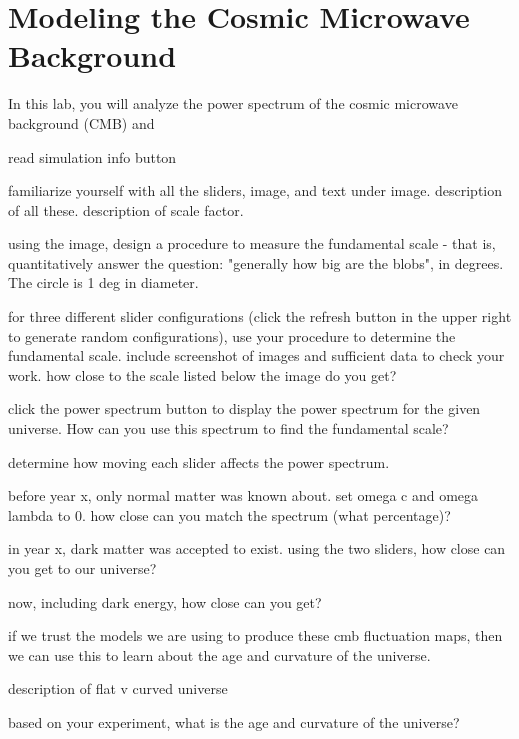 \chapter{Modeling the Cosmic Microwave Background}

In this lab, you will analyze the power spectrum of the cosmic microwave background (CMB) and %

read simulation info button

familiarize yourself with all the sliders, image, and text under image. description of all these. description of scale factor.

using the image, design a procedure to measure the fundamental scale - that is, quantitatively answer the question: "generally how big are the blobs", in degrees. The circle is 1 deg in diameter.

for three different slider configurations (click the refresh button in the upper right to generate random configurations), use your procedure to determine the fundamental scale. include screenshot of images and sufficient data to check your work. how close to the scale listed below the image do you get?

click the power spectrum button to display the power spectrum for the given universe. How can you use this spectrum to find the fundamental scale?

determine how moving each slider affects the power spectrum.

before year x, only normal matter was known about. set omega c and omega lambda to 0. how close can you match the spectrum (what percentage)?

in year x, dark matter was accepted to exist. using the two sliders, how close can you get to our universe?

now, including dark energy, how close can you get?

if we trust the models we are using to produce these cmb fluctuation maps, then we can use this to learn about the age and curvature of the universe.

description of flat v curved universe

based on your experiment, what is the age and curvature of the universe?

